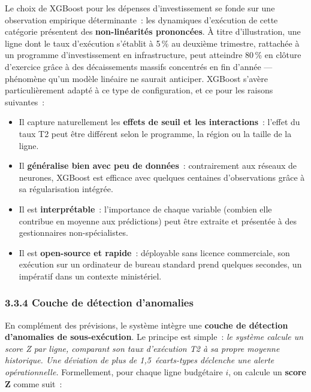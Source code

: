 Le choix de XGBoost pour les dépenses d'investissement se fonde sur une observation
empirique déterminante~: les dynamiques d'exécution de cette catégorie présentent des
\textbf{non-linéarités prononcées}. À titre d'illustration, une ligne dont le taux
d'exécution s'établit à 5\,\% au deuxième trimestre, rattachée à un programme
d'investissement en infrastructure, peut atteindre 80\,\% en clôture d'exercice grâce
à des décaissements massifs concentrés en fin d'année --- phénomène qu'un modèle
linéaire ne saurait anticiper. XGBoost s'avère particulièrement adapté à ce type de
configuration, et ce pour les raisons suivantes~:

\begin{itemize}
    \item Il capture naturellement les \textbf{effets de seuil et les interactions}~:
    l'effet du taux T2 peut être différent selon le programme, la région ou la taille
    de la ligne.
    \item Il \textbf{généralise bien avec peu de données}~: contrairement aux réseaux
    de neurones, XGBoost est efficace avec quelques centaines d'observations grâce à
    sa régularisation intégrée.
    \item Il est \textbf{interprétable}~: l'importance de chaque variable (combien elle
    contribue en moyenne aux prédictions) peut être extraite et présentée à des
    gestionnaires non-spécialistes.
    \item Il est \textbf{open-source et rapide}~: déployable sans licence commerciale,
    son exécution sur un ordinateur de bureau standard prend quelques secondes,
    un impératif dans un contexte ministériel.
\end{itemize}

\subsubsection*{3.3.4 \quad Couche de détection d'anomalies}

En complément des prévisions, le système intègre une \textbf{couche de détection
d'anomalies de sous-exécution}. Le principe est simple~: \textit{le système calcule
un score Z par ligne, comparant son taux d'exécution T2 à sa propre moyenne
historique. Une déviation de plus de 1,5~écarts-types déclenche une alerte
opérationnelle.} Formellement, pour chaque ligne budgétaire $i$, on calcule un
\textbf{score Z} comme suit~:

